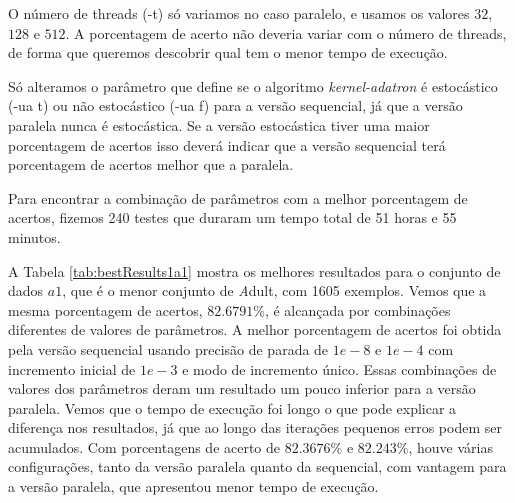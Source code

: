 O número de threads (-t) só variamos no caso paralelo, e usamos os valores $32$, $128$ e $512$. A porcentagem de acerto não deveria variar com o número de threads, de forma que queremos descobrir qual tem o menor tempo de execução.

Só alteramos o parâmetro que define se o algoritmo {\em kernel-adatron}  é estocástico (-ua t) ou não estocástico (-ua f) para a versão sequencial, já que a versão paralela nunca é estocástica. Se a versão estocástica tiver uma maior porcentagem de acertos isso deverá indicar que a versão sequencial terá porcentagem de acertos melhor que a paralela.


Para encontrar a combinação de parâmetros com a melhor porcentagem de acertos, fizemos 240 testes que duraram um tempo total de 51 horas e 55 minutos.

A Tabela \ref{tab:bestResults1a1} mostra os melhores resultados para o conjunto de dados $a1$, que é o menor conjunto de {\emph Adult}, com 1605 exemplos. Vemos que a mesma porcentagem de acertos, $82.6791\%$, é alcançada por combinações diferentes de valores de parâmetros. A melhor porcentagem de acertos foi obtida pela versão sequencial usando precisão de parada de $1e-8$ e $1e-4$ com incremento inicial de $1e-3$ e modo de incremento único. Essas combinações de valores dos parâmetros deram um resultado um pouco inferior para a versão paralela. Vemos que o tempo de execução foi longo o que pode explicar a diferença nos resultados, já que ao longo das iterações pequenos erros podem ser acumulados. Com porcentagens de acerto de $82.3676\%$ e $82.243\%$, houve várias configurações, tanto da versão paralela quanto da sequencial, com vantagem para a versão paralela, que apresentou menor tempo de execução.

